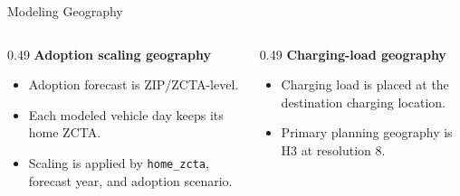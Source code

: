 \documentclass[aspectratio=169]{beamer}
\begin{document}
\begin{frame}{Modeling Geography}
\small
\begin{columns}[T,totalwidth=\linewidth]
\begin{column}{0.49\linewidth}
\textbf{Adoption scaling geography}
\begin{itemize}
  \item Adoption forecast is ZIP/ZCTA-level.
  \item Each modeled vehicle day keeps its home ZCTA.
  \item Scaling is applied by \texttt{home\_zcta}, forecast year, and adoption scenario.
\end{itemize}
\end{column}
\begin{column}{0.49\linewidth}
\textbf{Charging-load geography}
\begin{itemize}
  \item Charging load is placed at the destination charging location.
  \item Primary planning geography is H3 at resolution 8.
\end{itemize}
\end{column}
\end{columns}
\end{frame}

\end{document}

